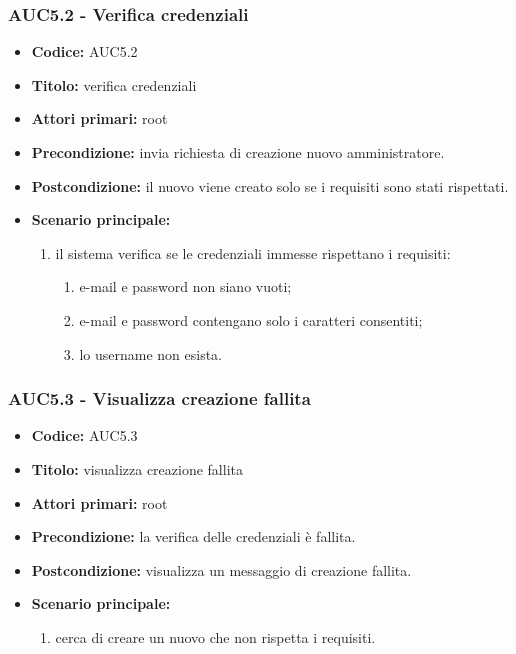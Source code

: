 \documentclass[casi-duso]{subfiles}
\begin{document}
\subsubsection{AUC5.2 - Verifica credenziali}%
\label{subsub:AUC5.2}
\begin{itemize}
  \item \textbf{Codice:} AUC5.2
  \item \textbf{Titolo:} verifica credenziali
  \item \textbf{Attori primari:} root
  \item \textbf{Precondizione:}  invia richiesta di creazione nuovo amministratore.
  \item \textbf{Postcondizione:} il nuovo  viene creato solo se i requisiti sono stati rispettati.
  \item \textbf{Scenario principale:}
  \begin{enumerate}
    \item il sistema verifica se le credenziali immesse rispettano i requisiti:
    \begin{enumerate}
      \item e-mail e password non siano vuoti;
      \item e-mail e password contengano solo i caratteri consentiti;
      \item lo username non esista.
    \end{enumerate}
  \end{enumerate}
\end{itemize}

\subsubsection{AUC5.3 - Visualizza creazione fallita}%
\label{subsub:AUC5.3}
\begin{itemize}
  \item \textbf{Codice:} AUC5.3
  \item \textbf{Titolo:} visualizza creazione fallita
  \item \textbf{Attori primari:} root
  \item \textbf{Precondizione:} la verifica delle credenziali è fallita.
  \item \textbf{Postcondizione:}  visualizza un messaggio di creazione fallita.
  \item \textbf{Scenario principale:}
  \begin{enumerate}
    \item {} cerca di creare un nuovo  che non rispetta i requisiti.
  \end{enumerate}
\end{itemize}
\end{document}
